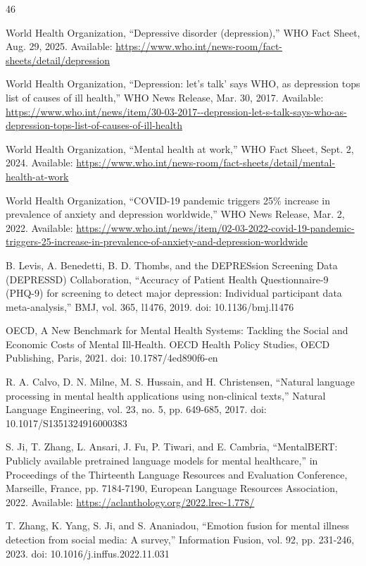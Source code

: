 \documentclass{ieeeaccess}
\begin{document}
\balance
\begin{thebibliography}{46}

 World Health Organization, ``Depressive disorder (depression),'' WHO Fact Sheet, Aug. 29, 2025. Available: \url{https://www.who.int/news-room/fact-sheets/detail/depression}

 World Health Organization, ``Depression: let's talk' says WHO, as depression tops list of causes of ill health,'' WHO News Release, Mar. 30, 2017. Available: \url{https://www.who.int/news/item/30-03-2017--depression-let-s-talk-says-who-as-depression-tops-list-of-causes-of-ill-health}

 World Health Organization, ``Mental health at work,'' WHO Fact Sheet, Sept. 2, 2024. Available: \url{https://www.who.int/news-room/fact-sheets/detail/mental-health-at-work}

 World Health Organization, ``COVID-19 pandemic triggers 25\% increase in prevalence of anxiety and depression worldwide,'' WHO News Release, Mar. 2, 2022. Available: \url{https://www.who.int/news/item/02-03-2022-covid-19-pandemic-triggers-25-increase-in-prevalence-of-anxiety-and-depression-worldwide}

 B. Levis, A. Benedetti, B. D. Thombs, and the DEPRESsion Screening Data (DEPRESSD) Collaboration, ``Accuracy of Patient Health Questionnaire-9 (PHQ-9) for screening to detect major depression: Individual participant data meta-analysis,'' BMJ, vol. 365, l1476, 2019. doi: 10.1136/bmj.l1476

 OECD, A New Benchmark for Mental Health Systems: Tackling the Social and Economic Costs of Mental Ill-Health. OECD Health Policy Studies, OECD Publishing, Paris, 2021. doi: 10.1787/4ed890f6-en

 R. A. Calvo, D. N. Milne, M. S. Hussain, and H. Christensen, ``Natural language processing in mental health applications using non-clinical texts,'' Natural Language Engineering, vol. 23, no. 5, pp. 649-685, 2017. doi: 10.1017/S1351324916000383

 S. Ji, T. Zhang, L. Ansari, J. Fu, P. Tiwari, and E. Cambria, ``MentalBERT: Publicly available pretrained language models for mental healthcare,'' in Proceedings of the Thirteenth Language Resources and Evaluation Conference, Marseille, France, pp. 7184-7190, European Language Resources Association, 2022. Available: \url{https://aclanthology.org/2022.lrec-1.778/}

 T. Zhang, K. Yang, S. Ji, and S. Ananiadou, ``Emotion fusion for mental illness detection from social media: A survey,'' Information Fusion, vol. 92, pp. 231-246, 2023. doi: 10.1016/j.inffus.2022.11.031


\end{thebibliography}
\end{document}
